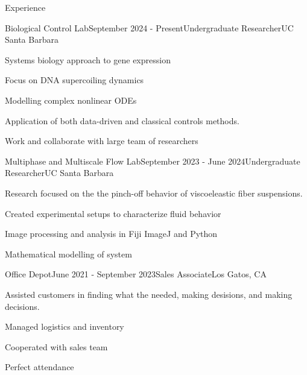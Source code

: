 \documentclass[
	11pt, %
]{resume} %
\begin{document}
\begin{rSection}{Experience}

	\begin{rSubsection}{Biological Control Lab}{September 2024 - Present}{Undergraduate Researcher}{UC Santa Barbara}
		\item Systems biology approach to gene expression
		\item Focus on DNA supercoiling dynamics
		\item Modelling complex nonlinear ODEs
		\item Application of both data-driven and classical controls methods.
		\item Work and collaborate with large team of researchers
	\end{rSubsection}


	\begin{rSubsection}{Multiphase and Multiscale Flow Lab}{September 2023 - June 2024}{Undergraduate Researcher}{UC Santa Barbara}
		\item Research focused on the the pinch-off behavior of viscoeleastic fiber suspensions.
		\item Created experimental setups to characterize fluid behavior
		\item Image processing and analysis in Fiji ImageJ and Python
		\item Mathematical modelling of system
	\end{rSubsection}


	\begin{rSubsection}{Office Depot}{June 2021 - September 2023}{Sales Associate}{Los Gatos, CA}
		\item Assisted customers in finding what the needed, making desisions, and making decisions.
		\item Managed logistics and inventory
		\item Cooperated with sales team
		\item Perfect attendance
	\end{rSubsection}

\end{rSection}

\end{document}
